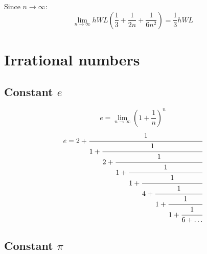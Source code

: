 Since $n\to\infty$:
\begin{equation*}
  \lim_{n\to\infty} hWL\left(\frac{1}{3}+\frac{1}{2n}+\frac{1}{6n^2}\right) = \frac{1}{3}hWL
\end{equation*}


\section{Irrational numbers}
\subsection{Constant $e$}
\begin{equation*}
  e = \lim_{n\to\infty} \left( 1 + \frac{1}{n} \right)^n
\end{equation*}
\begin{equation*}
  e = 2 + \cfrac{1}{1+\cfrac{1}{2+\cfrac{1}{1+\cfrac{1}{1+\cfrac{1}{4+\cfrac{1}{1+\cfrac{1}{1+\cfrac{1}{6+\ldots}}}}}}}}
\end{equation*}



\subsection{Constant $\pi$}
